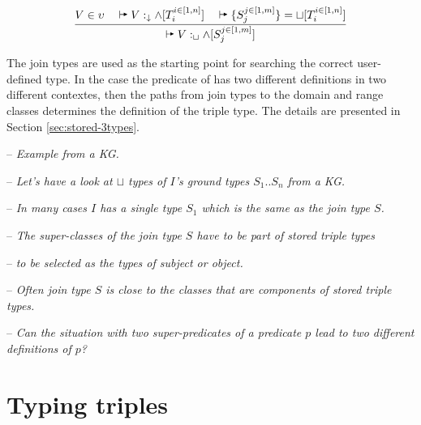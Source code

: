 \documentclass[runningheads]{llncs}
\newcommand{\darr}{\downarrow}
\newcommand{\vdasharr}{%
    \mathrel{%
        \vdash\hspace*{-5pt}%
        \raisebox{2.3pt}{\scalebox{.5}{\(\blacktriangleright\)}}%
    }%
}\newcommand{\D}{{\Delta}}
\newcommand{\notes}[1]{\noindent\begin{small}-- \emph{#1}\hfill\break\end{small}}
\newcommand{\nnotes}[1]{\indent\begin{small}-- \emph{#1}\hfill\break\end{small}}
\begin{document}
\begin{equation}
\label{rul:join-alg} 
\dfrac{V\in\upsilon\quad\vdasharr\/V:_\darr\land[T_i^{i\in[1,n]}]\quad\/\vdasharr\{S_j^{j\in[1,m]}\}=\sqcup[T_i^{i\in[1,n]}]}
      {\vdasharr\/V:_\sqcup\land[S_j^{j\in[1,m]}]}
\end{equation}

The join types are used as the starting point for searching the
correct user-defined type. In the case the predicate of has two
different definitions in two different contextes, then the paths from
join types to the domain and range classes determines the definition
of the triple type. The details are presented in Section
\ref{sec:stored-3types}.


\notes{Example from a KG.}
\notes{Let's have a look at $\sqcup$ types of $I$'s ground types $S_1..S_n$ from a KG. }
\nnotes{In many cases $I$ has a single type $S_1$ which is the same as the join type $S$.}
\nnotes{The super-classes of the join type $S$ have to be part of stored triple types}
\nnotes{to be selected as the types of subject or object.}
\nnotes{Often join type $S$ is close to the classes that are components of stored triple types.}
\notes{Can the situation with two super-predicates of a predicate $p$ lead to two different definitions of $p$?}










\section{Typing triples\label{sec:triples}}
\end{document}
